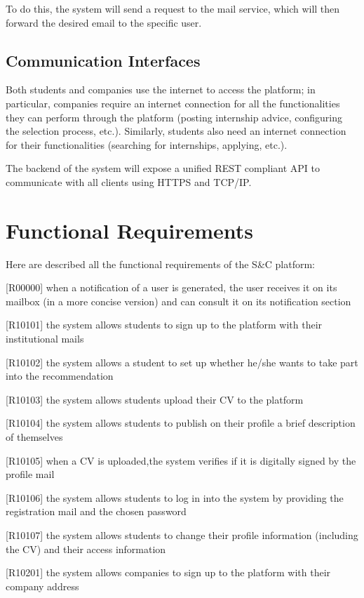 				To do this, the system will send a request to the mail service, which will then forward the desired email to the specific user.
	
	
		\subsection{Communication Interfaces}
			
			Both students and companies use the internet to access the platform; in particular, companies require an internet connection for all the functionalities they can perform through the platform (posting internship advice, configuring the selection process, etc.). Similarly, students also need an internet connection for their functionalities (searching for internships, applying, etc.).
			
			The backend of the system will expose a unified REST compliant API to communicate with all clients using HTTPS and TCP/IP.
	\section{Functional Requirements}
	
		Here are described all the functional requirements of the S\&C platform:
		
		
		[R00000] when a notification of a user is generated, the user receives it on its mailbox (in a more concise version) and can consult it on its notification section
		
		[R10101] the system allows students to sign up to the platform with their institutional mails
		
		[R10102] the system allows a student to set up whether he/she wants to take part into the recommendation
		
		[R10103] the system allows students upload their CV to the platform
		
		[R10104] the system allows students to publish on their profile a brief description of themselves
		
		[R10105] when a CV is uploaded,the system verifies if it is digitally signed by the profile mail
		
		[R10106] the system allows students to log in into the system by providing the registration mail and the chosen	password
		
		[R10107] the system allows students to change their profile information (including the CV) and their access information
		
		[R10201] the system allows companies to sign up to the platform with their company address
		
